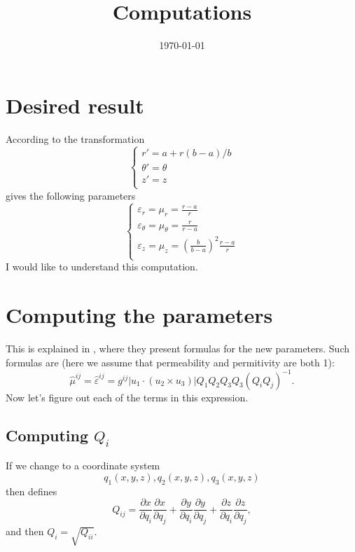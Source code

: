 \documentclass{amsart}
\begin{document}
\newcommand{\R}{\mathbb{R}}
\newcommand\tbf[1]{\textbf{#1}}
\newcommand\myworries[1]{\textcolor{red}{\tbf{#1}}}

\title{Computations}
\date{\today}
\maketitle

\section{Desired result}

According to \cite{smith06} the transformation
\begin{equation}\label{THEtransCyl}
  \begin{cases}
  r'=a+r(b-a)/b\\
  \theta'=\theta\\
  z'=z\\
\end{cases}\end{equation}
gives the following parameters
\begin{equation}\begin{cases}
  \varepsilon_r=\mu_r=\frac{r-a}{r}\\
  \varepsilon_\theta=\mu_\theta=\frac{r}{r-a}\\
  \varepsilon_z=\mu_z=\left(\frac{b}{b-a}\right)^2\frac{r-a}{r}\\
\end{cases}\end{equation}
I would like to understand this computation.

\section{Computing the parameters}
This is explained in \cite{ward96}, where they present formulas for the new parameters.
Such formulas are (here we assume that permeability and permitivity are both 1):
\begin{equation}
  \hat{\mu}^{ij}=\hat{\varepsilon}^{ij}=g^{ij}|u_1\cdot(u_2\times u_3)|Q_1Q_2Q_3Q_3(Q_iQ_j)^{-1}.
\end{equation}
Now let's figure out each of the terms in this expression.

\subsection{Computing $Q_i$} If we change to a coordinate system
\[q_1(x,y,z),q_2(x,y,z),q_3(x,y,z)\]
then \cite{ward96} defines
\begin{equation}\label{matrixQ}
  Q_{ij}=\frac{\partial x}{\partial q_i}\frac{\partial x}{\partial q_j}+\frac{\partial y}{\partial q_i}\frac{\partial y}{\partial q_j}+\frac{\partial z}{\partial q_i}\frac{\partial z}{\partial q_j},
\end{equation}
and then $Q_i=\sqrt{Q_{ii}}$.
\end{document}
